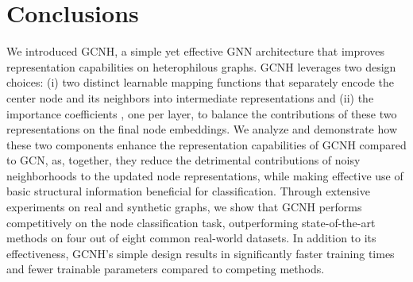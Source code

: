 \documentclass[conference]{IEEEtran}
\begin{document}
\section{Conclusions}
We introduced GCNH, a simple yet effective GNN architecture that improves representation capabilities on heterophilous graphs. 
GCNH leverages two design choices: (i) two distinct learnable mapping functions that separately encode the center node and its neighbors into intermediate representations and (ii) the importance coefficients , one per layer, to balance the contributions of these two representations on the final node embeddings.
We analyze and demonstrate how these two components enhance the representation capabilities of GCNH compared to GCN, as, together, they reduce the detrimental contributions of noisy neighborhoods to the updated node representations, while making effective use of basic structural information beneficial for classification. 
Through extensive experiments on real and synthetic graphs, we show that GCNH performs competitively on the node classification task, outperforming state-of-the-art methods on four out of eight common real-world datasets.  
In addition to its effectiveness, GCNH's simple design results in significantly faster training times and fewer trainable parameters compared to competing methods.
\end{document}
